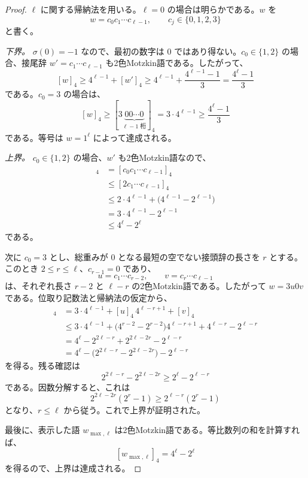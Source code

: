 \documentclass[12pt]{ltjsarticle}
\theoremstyle{plain}
\theoremstyle{definition}
\theoremstyle{plain}
\begin{document}
\begin{proof}
$\ell$ に関する帰納法を用いる。$\ell=0$ の場合は明らかである。$w$ を
\[
 w=c_0c_1\cdots c_{\ell-1},
 \qquad
 c_j\in\{0,1,2,3\}
\]
と書く。

\emph{下界。}
$\sigma(0)=-1$ なので、最初の数字は $0$ ではあり得ない。$c_0\in\{1,2\}$ の場合、接尾辞 $w'=c_1\cdots c_{\ell-1}$ も2色Motzkin語である。したがって、
\[
  [w]_4\geq4^{\ell-1}+[w']_4
  \geq4^{\ell-1}+\frac{4^{\ell-1}-1}{3}
  =\frac{4^{\ell}-1}{3}
\]
である。$c_0=3$ の場合は、
\[
  [w]_4
  \geq[3\underbrace{00\cdots0}_{\ell-1\text{ 桁}}]_4
  =3\cdot4^{\ell-1}
  \geq\frac{4^{\ell}-1}{3}
\]
である。等号は $w=1^{\ell}$ によって達成される。

\emph{上界。}
$c_0\in\{1,2\}$ の場合、$w'$ も2色Motzkin語なので、
\begin{align*}
  [w]_4
  &=[c_0c_1\cdots c_{\ell-1}]_4\\
  &\leq[2c_1\cdots c_{\ell-1}]_4\\
  &\leq2\cdot4^{\ell-1}+\bigl(4^{\ell-1}-2^{\ell-1}\bigr)\\
  &=3\cdot4^{\ell-1}-2^{\ell-1}\\
  &\leq4^{\ell}-2^{\ell}
\end{align*}
である。

次に $c_0=3$ とし、総重みが $0$ となる最短の空でない接頭辞の長さを $r$ とする。このとき $2\leq r\leq\ell$、$c_{r-1}=0$ であり、
\[
  u=c_1\cdots c_{r-2},
  \qquad
  v=c_r\cdots c_{\ell-1}
\]
は、それぞれ長さ $r-2$ と $\ell-r$ の2色Motzkin語である。したがって $w=3u0v$ である。位取り記数法と帰納法の仮定から、
\begin{align*}
  [w]_4
  &=3\cdot4^{\ell-1}+[u]_4\,4^{\ell-r+1}+[v]_4\\
  &\leq3\cdot4^{\ell-1}
    +\bigl(4^{r-2}-2^{r-2}\bigr)4^{\ell-r+1}
    +4^{\ell-r}-2^{\ell-r}\\
  &=4^{\ell}-2^{2\ell-r}+2^{2\ell-2r}-2^{\ell-r}\\
  &=4^{\ell}-\bigl(2^{2\ell-r}-2^{2\ell-2r}\bigr)-2^{\ell-r}
\end{align*}
を得る。残る確認は
\[
  2^{2\ell-r}-2^{2\ell-2r}
  \geq2^{\ell}-2^{\ell-r}
\]
である。因数分解すると、これは
\[
  2^{2\ell-2r}(2^r-1)\geq2^{\ell-r}(2^r-1)
\]
となり、$r\leq\ell$ から従う。これで上界が証明された。

最後に、表示した語 $w_{\max,\ell}$ は2色Motzkin語である。等比数列の和を計算すれば、
\[
  [w_{\max,\ell}]_4=4^{\ell}-2^{\ell}
\]
を得るので、上界は達成される。
\end{proof}
\end{document}
